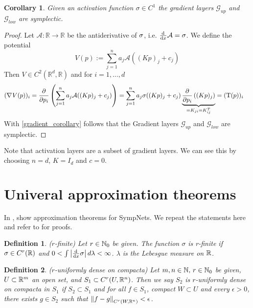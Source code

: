 \documentclass[twoside,a4paper]{article}
\newtheorem{definition}{Definition}
\newtheorem{corollary}{Corollary}
\begin{document}
\begin{corollary}
	Given an activation function $\sigma \in C^1$ the gradient layers $\mathcal{G}_{up}$
	and $\mathcal{G}_{low}$ are symplectic.
\end{corollary}
\begin{proof}
	Let $\mathcal{A}: \mathbb{R} \to \mathbb{R}$ be the antiderivative of $\sigma$, 
	i.e. $\frac{\mathrm{d}^{}}{\mathrm{d}x} \mathcal{A} = \sigma$. We define the potential
	\begin{equation*}
		V(p) := \sum_{j=1}^n a_j \mathcal{A}((Kp)_j + c_j)
	\end{equation*}
	Then $V \in C^2(\mathbb{R}^d, \mathbb{R})$ and for $i=1, \dots, d$
	\begin{align*}
		(\nabla_{}{V(p)})_i &= \frac{\partial }{\partial p_i} \left( \sum_{j=1}^n a_j \mathcal{A}((Kp)_j + c_j) \right)
		= \sum_{j=1}^n a_j \sigma((Kp)_j + c_j) 
		\underbrace{\frac{\partial }{\partial p_i} \left( (Kp)_j \right)}_{=K_{ji} = K^T_{ij}}
		= (\mathrm{T}(p))_i
	\end{align*}
	With \cref{gradient_corollary} follows that the Gradient layers
	$\mathcal{G}_{up}$ and $\mathcal{G}_{low}$ are symplectic.
\end{proof}

Note that activation layers are a subset of gradient layers. We can see this by choosing
$n=d$, $K=I_d$ and $c=0$.

\section{Univeral approximation theorems}

In \cite{Jin2020}, \citeauthor{Jin2020} show approximation theorems for SympNets.
We repeat the statements here and refer to \cite{Jin2020} for proofs.

\begin{definition}
	($r$-finite)
	Let $r \in \mathbb{N}_0$ be given. The function $\sigma$ is r-finite if $\sigma \in C^r(\mathbb{R})$
	and $0 < \int \left|{\frac{\mathrm{d}^{}}{\mathrm{d}x} \sigma}\right| d\lambda < \infty$. $\lambda$ is the Lebesgue measure on $\mathbb{R}$.
\end{definition}

\begin{definition}
	($r$-uniformly dense on compacta)
	Let $m,n \in \mathbb{N}, \, r \in \mathbb{N}_0$ be given, $U \subset \mathbb{R}^m$ an open set,
	and $S_1 \subset C^r(U,\mathbb{R}^n)$. Then we say $S_2$ is $r$-uniformly dense
	on compacta in $S_1$ if $S_2 \subset S_1$ and for all $f \in S_1$, compact
	$W \subset U$ and every $\epsilon > 0$, there exists $g \in S_2$ such that
	$\left\lVert{f-g}\right\rVert_{C^r(W,\mathbb{R}^n)} < \epsilon$.
\end{definition}
\end{document}

